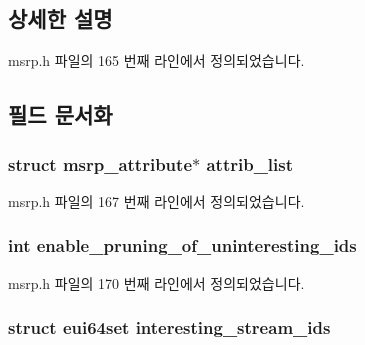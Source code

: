 \subsection{상세한 설명}


msrp.\+h 파일의 165 번째 라인에서 정의되었습니다.



\subsection{필드 문서화}
\subsubsection[{\texorpdfstring{attrib\+\_\+list}{attrib_list}}]{\setlength{\rightskip}{0pt plus 5cm}struct {\bf msrp\+\_\+attribute}$\ast$ attrib\+\_\+list}\hypertarget{structmsrp__database_a171377a96c019410091ac2838ea2be82}{}\label{structmsrp__database_a171377a96c019410091ac2838ea2be82}


msrp.\+h 파일의 167 번째 라인에서 정의되었습니다.

\subsubsection[{\texorpdfstring{enable\+\_\+pruning\+\_\+of\+\_\+uninteresting\+\_\+ids}{enable_pruning_of_uninteresting_ids}}]{\setlength{\rightskip}{0pt plus 5cm}int enable\+\_\+pruning\+\_\+of\+\_\+uninteresting\+\_\+ids}\hypertarget{structmsrp__database_a9134b5b401b0a77d3be7d4b3cbb27294}{}\label{structmsrp__database_a9134b5b401b0a77d3be7d4b3cbb27294}


msrp.\+h 파일의 170 번째 라인에서 정의되었습니다.

\subsubsection[{\texorpdfstring{interesting\+\_\+stream\+\_\+ids}{interesting_stream_ids}}]{\setlength{\rightskip}{0pt plus 5cm}struct {\bf eui64set} interesting\+\_\+stream\+\_\+ids}\hypertarget{structmsrp__database_a116b6f6befbaedf09d11f7c09a1f24e8}{}\label{structmsrp__database_a116b6f6befbaedf09d11f7c09a1f24e8}


